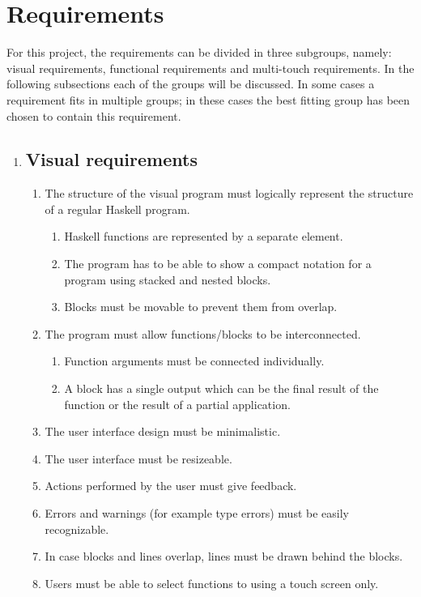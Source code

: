 \section{Requirements}

For this project, the requirements can be divided in three subgroups, namely: visual requirements, functional requirements and multi-touch requirements. In the following subsections each of the groups will be discussed. In some cases a requirement fits in multiple groups; in these cases the best fitting group has been chosen to contain this requirement.

\begin{enumerate}
\item \subsection*{Visual requirements}

\begin{enumerate}
	\item The structure of the visual program must logically represent the structure of a regular Haskell program.
		\begin{enumerate}
			\item Haskell functions are represented by a separate element.
			\item The program has to be able to show a compact notation for a program using stacked and nested blocks.
			\item Blocks must be movable to prevent them from overlap.
		\end{enumerate}
	\item The program must allow functions/blocks to be interconnected.
		\begin{enumerate}
			\item Function arguments must be connected individually.
			\item A block has a single output which can be the final result of the function or the result of a partial application.
		\end{enumerate}
	\item The user interface design must be minimalistic.
	\item The user interface must be resizeable.
	\item Actions performed by the user must give feedback.
	\item Errors and warnings (for example type errors) must be easily recognizable.
	\item In case blocks and lines overlap, lines must be drawn behind the blocks.
	\item Users must be able to select functions to using a touch screen only.
\end{enumerate}


\end{enumerate}
